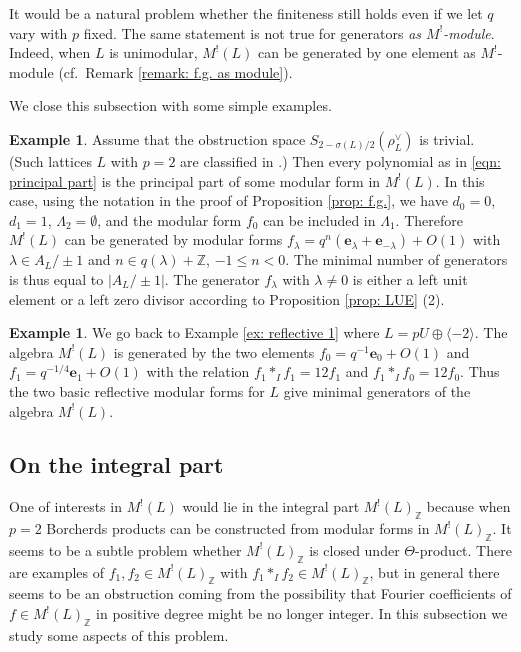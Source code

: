 \documentclass[12pt]{amsart}
\numberwithin{equation}{section}
\theoremstyle{definition}
\newtheorem{example}[theorem]{Example}
\theoremstyle{remark}
\newcommand{\Z}{\mathbb{Z}}
\newcommand{\ML}{M^{!}(L)}
\newcommand{\MLZ}{M^{!}(L)_{\mathbb{Z}}}
\begin{document}
It would be a natural problem whether the finiteness still holds 
even if we let $q$ vary with $p$ fixed. 
The same statement is not true for generators \textit{as $M^!$-module}. 
Indeed, when $L$ is unimodular, 
${\ML}$ can be generated by one element as $M^!$-module (cf.~Remark \ref{remark: f.g. as module}). 




We close this subsection with some simple examples. 


\begin{example}
Assume that the obstruction space 
$S_{2-\sigma(L)/2}(\rho_{L}^{\vee})$ 
is trivial. 
(Such lattices $L$ with $p=2$ are classified in \cite{B-E-F}.) 
Then every polynomial as in \eqref{eqn: principal part} 
is the principal part of some modular form in ${\ML}$. 
In this case, using the notation in the proof of Proposition \ref{prop: f.g.}, 
we have 
$d_{0}=0$, 
$d_{1}=1$, 
$\Lambda_{2}=\emptyset$, 
and the modular form $f_{0}$ can be included in $\Lambda_{1}$. 
Therefore ${\ML}$ can be generated by modular forms 
$f_{\lambda}=q^n(\mathbf{e}_{\lambda}+\mathbf{e}_{-\lambda})+O(1)$ 
with $\lambda\in A_L/\pm1$ and $n\in q(\lambda)+{\Z}$, $-1\leq n < 0$. 
The minimal number of generators is thus equal to $|A_{L}/\pm1|$. 
The generator $f_{\lambda}$ with $\lambda\ne 0$ 
is either a left unit element or a left zero divisor 
according to Proposition \ref{prop: LUE} (2). 
\end{example}


\begin{example}\label{ex: generator}
We go back to Example \ref{ex: reflective 1} where $L=pU \oplus \langle -2 \rangle$. 
The algebra ${\ML}$ is generated by the two elements 
$f_{0}=q^{-1}\mathbf{e}_{0}+O(1)$ and 
$f_{1}=q^{-1/4}\mathbf{e}_{1}+O(1)$ 
with the relation 
$f_{1}\ast_{I} f_{1}= 12 f_{1}$ and $f_{1}\ast_{I} f_{0}= 12 f_{0}$.  
Thus the two basic reflective modular forms for $L$ 
give minimal generators of the algebra ${\ML}$.  
\end{example}




\subsection{On the integral part}\label{ssec: integral part}

One of interests in ${\ML}$ would lie in the integral part ${\MLZ}$ 
because when $p=2$ Borcherds products can be constructed from modular forms in ${\MLZ}$. 
It seems to be a subtle problem 
whether ${\MLZ}$ is closed under $\Theta$-product. 
There are examples of $f_{1}, f_{2}\in {\MLZ}$ with $f_{1}\ast_{I}f_{2}\in {\MLZ}$, 
but in general there seems to be an obstruction coming from the possibility that 
Fourier coefficients of $f\in{\MLZ}$ in positive degree might be no longer integer. 
In this subsection we study some aspects of this problem. 
\end{document}
